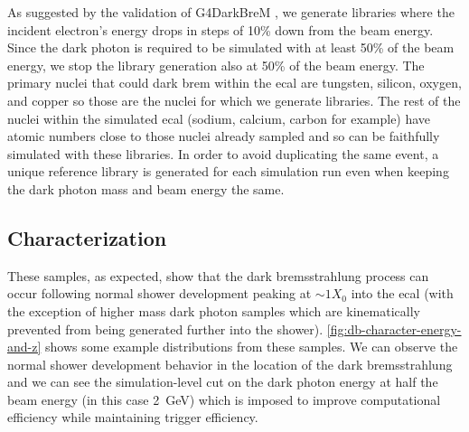 As suggested by the validation of G4DarkBreM \cite{g4darkbrem}, we generate libraries where the
incident electron's energy drops in steps of 10\% down from the beam energy. Since the dark photon
is required to be simulated with at least 50\% of the beam energy, we stop the library generation
also at 50\% of the beam energy. The primary nuclei that could dark brem within the \ac{ecal} are
tungsten, silicon, oxygen, and copper so those are the nuclei for which we generate libraries. The
rest of the nuclei within the simulated \ac{ecal} (sodium, calcium, carbon for example) have atomic
numbers close to those nuclei already sampled and so can be faithfully simulated with these
libraries. In order to avoid duplicating the same event, a unique reference library is generated
for each simulation run even when keeping the dark photon mass and beam energy the same.

\subsection{Characterization}
These samples, as expected, show that the dark bremsstrahlung process can occur following
normal shower development peaking at $\sim 1 X_0$ into the \ac{ecal} (with the exception of
higher mass dark photon samples which are kinematically prevented from being generated further
into the shower).
\cref{fig:db-character-energy-and-z} shows some example distributions from these samples.
We can observe the normal shower development behavior in the location of the dark bremsstrahlung
and we can see the simulation-level cut on the dark photon energy at half the beam energy
(in this case \qty{2}{\giga\electronvolt}) which is imposed to improve computational efficiency
while maintaining trigger efficiency.

